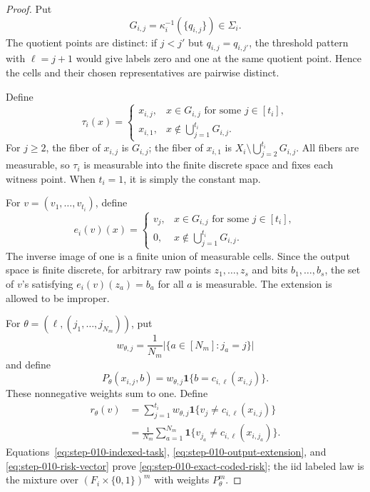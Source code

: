 \begin{proof}
Put
\begin{equation}\label{eq:step-010-witness-cells}
G_{i,j}=\kappa_i^{-1}(\{q_{i,j}\})\in\Sigma_i.
\end{equation}
The quotient points are distinct: if \(j<j'\) but
\(q_{i,j}=q_{i,j'}\), the threshold pattern with \(\ell=j+1\) would give
labels zero and one at the same quotient point.  Hence the cells and their
chosen representatives are pairwise distinct.

Define
\begin{equation}\label{eq:step-010-retraction}
\tau_i(x)=
\begin{cases}
x_{i,j},&x\in G_{i,j}\text{ for some }j\in[t_i],\\
x_{i,1},&x\notin\bigcup_{j=1}^{t_i}G_{i,j}.
\end{cases}
\end{equation}
For \(j\ge2\), the fiber of \(x_{i,j}\) is \(G_{i,j}\); the fiber of
\(x_{i,1}\) is \(X_i\setminus\bigcup_{j=2}^{t_i}G_{i,j}\).  All fibers
are measurable, so \(\tau_i\) is measurable into the finite discrete
space and fixes each witness point.  When \(t_i=1\), it is simply the
constant map.

For \(v=(v_1,\ldots,v_{t_i})\), define
\begin{equation}\label{eq:step-010-output-extension}
e_i(v)(x)=
\begin{cases}
v_j,&x\in G_{i,j}\text{ for some }j\in[t_i],\\
0,&x\notin\bigcup_{j=1}^{t_i}G_{i,j}.
\end{cases}
\end{equation}
The inverse image of one is a finite union of measurable cells.  Since the
output space is finite discrete, for arbitrary raw points \(z_1,\ldots,z_s\)
and bits \(b_1,\ldots,b_s\), the set of \(v\)'s satisfying
\(e_i(v)(z_a)=b_a\) for all \(a\) is measurable.  The extension is allowed
to be improper.

For \(\theta=(\ell,(j_1,\ldots,j_{N_m}))\), put
\begin{equation}\label{eq:step-010-row-weights}
w_{\theta,j}=\frac1{N_m}
\bigl|\{a\in[N_m]:j_a=j\}\bigr|
\end{equation}
and define
\begin{equation}\label{eq:step-010-finite-training-law}
P_\theta(x_{i,j},b)
=w_{\theta,j}\mathbf1\{b=c_{i,\ell}(x_{i,j})\}.
\end{equation}
These nonnegative weights sum to one.  Define
\begin{equation}\label{eq:step-010-risk-vector}
\begin{split}
r_\theta(v)
&=\sum_{j=1}^{t_i}w_{\theta,j}
\mathbf1\{v_j\ne c_{i,\ell}(x_{i,j})\}\\
&=\frac1{N_m}\sum_{a=1}^{N_m}
\mathbf1\{v_{j_a}\ne c_{i,\ell}(x_{i,j_a})\}.
\end{split}
\end{equation}
Equations~\eqref{eq:step-010-indexed-task},
\eqref{eq:step-010-output-extension}, and
\eqref{eq:step-010-risk-vector} prove
\eqref{eq:step-010-exact-coded-risk}; the iid labeled law is the mixture
over \((F_i\times\{0,1\})^m\) with weights \(P_\theta^m\).


\end{proof}
